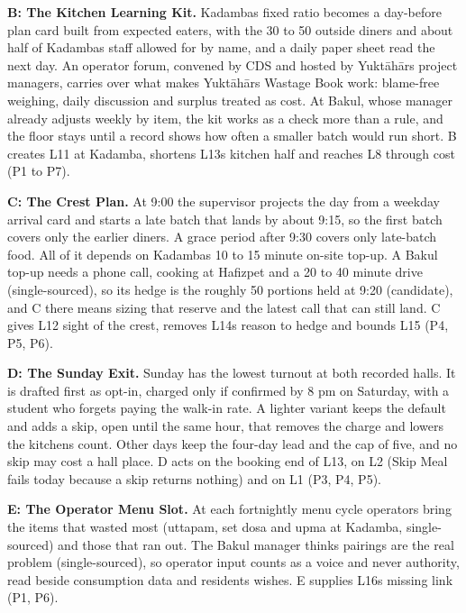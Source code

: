 \documentclass[
  10pt,
  table]{article}
\begin{document}
\textbf{B: The Kitchen Learning Kit.} Kadamba\textquotesingle s fixed ratio becomes a day-before plan card built from expected eaters, with the 30 to 50 outside diners and about half of Kadamba\textquotesingle s staff allowed for by name, and a daily paper sheet read the next day. An operator forum, convened by CDS and hosted by Yuktāhār\textquotesingle s project managers, carries over what makes Yuktāhār\textquotesingle s Wastage Book work: blame-free weighing, daily discussion and surplus treated as cost. At Bakul, whose manager already adjusts weekly by item, the kit works as a check more than a rule, and the floor stays until a record shows how often a smaller batch would run short. B creates L11 at Kadamba, shortens L13\textquotesingle s kitchen half and reaches L8 through cost (P1 to P7).

\textbf{C: The Crest Plan.} At 9:00 the supervisor projects the day from a weekday arrival card and starts a late batch that lands by about 9:15, so the first batch covers only the earlier diners. A grace period after 9:30 covers only late-batch food. All of it depends on Kadamba\textquotesingle s 10 to 15 minute on-site top-up. A Bakul top-up needs a phone call, cooking at Hafizpet and a 20 to 40 minute drive (single-sourced), so its hedge is the roughly 50 portions held at 9:20 (candidate), and C there means sizing that reserve and the latest call that can still land. C gives L12 sight of the crest, removes L14\textquotesingle s reason to hedge and bounds L15 (P4, P5, P6).

\textbf{D: The Sunday Exit.} Sunday has the lowest turnout at both recorded halls. It is drafted first as opt-in, charged only if confirmed by 8 pm on Saturday, with a student who forgets paying the walk-in rate. A lighter variant keeps the default and adds a skip, open until the same hour, that removes the charge and lowers the kitchen\textquotesingle s count. Other days keep the four-day lead and the cap of five, and no skip may cost a hall place. D acts on the booking end of L13, on L2 (Skip Meal fails today because a skip returns nothing) and on L1 (P3, P4, P5).

\textbf{E: The Operator Menu Slot.} At each fortnightly menu cycle operators bring the items that wasted most (uttapam, set dosa and upma at Kadamba, single-sourced) and those that ran out. The Bakul manager thinks pairings are the real problem (single-sourced), so operator input counts as a voice and never authority, read beside consumption data and residents\textquotesingle{} wishes. E supplies L16\textquotesingle s missing link (P1, P6).
\end{document}
